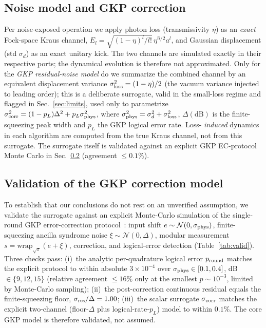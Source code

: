 \documentclass[12pt]{iopart}
\begin{document}
\subsection{Noise model and GKP correction}
Per noise-exposed operation we apply photon loss (transmissivity $\eta$) as
an \emph{exact} Fock-space Kraus channel,
$E_l=\sqrt{(1-\eta)^l/l!}\,\eta^{\hat n/2}a^l$, and Gaussian displacement
(std $\sigma_d$) as an exact unitary kick. The two channels are simulated
exactly in their respective ports; the dynamical evolution is therefore not
approximated. Only for the \emph{GKP residual-noise model} do we summarize the
combined channel by an equivalent displacement variance
$\sigma_{\rm loss}^2=(1-\eta)/2$ (the vacuum variance injected to leading
order); this is a deliberate surrogate, valid in the small-loss regime and
flagged in Sec.~\ref{sec:limits}, used only to parametrize
$\sigma_{\rm corr}^2=(1-p_L)\Delta^2+p_L\sigma_{\rm phys}^2$, where
$\sigma_{\rm phys}^2=\sigma_d^2+\sigma_{\rm loss}^2$, $\Delta(\mathrm{dB})$ is
the finite-squeezing peak width and $p_L$ the GKP logical error rate. Loss-
\emph{induced} dynamics in each algorithm are computed from the true Kraus
channel, not from this surrogate. The surrogate itself is validated against an
explicit GKP EC-protocol Monte Carlo in Sec.~\ref{sec:valid}
(agreement $\le0.1\%$).

\subsection{Validation of the GKP correction model}\label{sec:valid}
To establish that our conclusions do not rest on an unverified assumption, we
validate the surrogate against an explicit Monte-Carlo simulation of the
single-round GKP error-correction protocol~\cite{Glancy2006,GKP2001}: input
shift
$e\sim\mathcal N(0,\sigma_{\rm phys})$, finite-squeezing ancilla syndrome noise
$\xi\sim\mathcal N(0,\Delta)$, modular measurement
$s=\mathrm{wrap}_{\sqrt\pi}(e+\xi)$, correction, and logical-error detection
(Table~\ref{tab:valid}). Three checks pass: (i)~the analytic per-quadrature
logical error $p_{\rm round}$ matches the explicit protocol to within absolute
$3\times10^{-4}$ over $\sigma_{\rm phys}\in[0.1,0.4]$, dB$\in\{9,12,15\}$
(relative agreement $\le16\%$ only at the smallest $p\sim10^{-3}$, limited by
Monte-Carlo sampling); (ii)~the post-correction continuous residual equals the
finite-squeezing floor, $\sigma_{\rm res}/\Delta=1.00$; (iii)~the scalar
surrogate $\sigma_{\rm corr}$ matches the explicit two-channel
(floor-$\Delta$ plus logical-rate-$p_L$) model to within $0.1\%$. The core GKP
model is therefore validated, not assumed.
\end{document}
